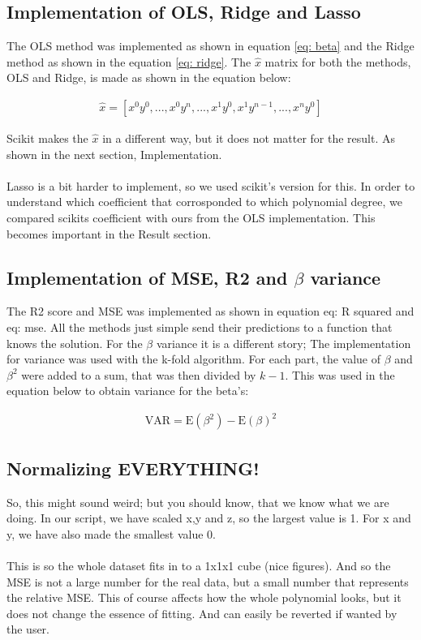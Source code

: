 \subsection{Implementation of OLS, Ridge and Lasso}

The OLS method was implemented as shown in equation \ref{eq: beta} and the Ridge
method as shown in the equation \ref{eq: ridge}. The $\hat{x}$ matrix
for both the methods, OLS and Ridge, is made as shown in the equation below:

\begin{align*}
    \hat{x} = [x^0y^0,...,x^0y^n,...,x^1y^0,x^1y^{n-1},...,x^ny^0]
\end{align*}

Scikit makes the $\hat{x}$ in a different way, but it does not matter for the result.
As shown in the next section, Implementation.
\\
\\
Lasso is a bit harder to implement, so we used scikit's version for this.\cite{scikit}
In order to understand which coefficient that corrosponded to which polynomial degree,
we compared scikits coefficient with ours from the OLS implementation. This becomes important in
the Result section.

\subsection{Implementation of MSE, R2 and $\beta$ variance}

The R2 score and MSE was implemented as shown in equation {eq: R squared} and {eq: mse}.
All the methods just simple send their predictions to a function that knows the solution.
For the $\beta$ variance it is a different story; The implementation for variance was used with the k-fold algorithm.
For each part, the value of $\beta$ and $\beta^2$ were added to a sum, that was then divided by
$k-1$. This was used in the equation below to obtain variance for the beta's:

\begin{align*}
    \text{VAR} = \text{E}(\beta^2) - \text{E}(\beta)^2
\end{align*}

\subsection{Normalizing EVERYTHING!}\label{sec:normal}
So, this might sound weird; but you should know, that we know what we are doing.
In our script, we have scaled x,y and z, so the largest value is 1. For x and y, we have
also made the smallest value 0.
\\
\\
This is so the whole dataset fits in to a 1x1x1 cube (nice figures). And so the MSE is not a large
number for the real data, but a small number that represents the relative MSE. This of course affects
how the whole polynomial looks, but it does not change the essence of fitting. And can easily be reverted
if wanted by the user.
